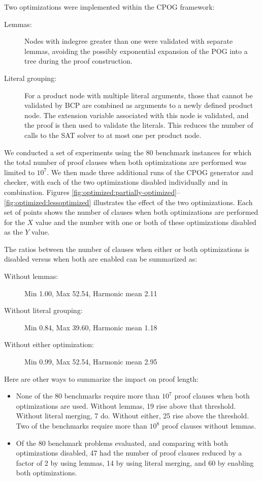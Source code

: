 \documentclass[letterpaper,USenglish,cleveref, autoref, thm-restate]{lipics-v2021}
\begin{document}
Two optimizations were implemented within the CPOG framework:
\begin{description}
\item[Lemmas:] Nodes with indegree greater than one were validated with separate lemmas, avoiding the possibly exponential expansion of the POG into a tree during the proof construction.

\item[Literal grouping:] For a product node with multiple literal
  arguments, those that cannot be validated by BCP are combined as
  arguments to a newly defined product node.  The extension variable
  associated with this node is validated, and the proof is then used
  to validate the literals.  This reduces the number of
  calls to the SAT solver to at most one per product node.
\end{description}





We conducted a set of experiments using the 80 benchmark instances for
which the total number of proof clauses when both optimizations are
performed was limited to $10^7$.  We then made three additional runs
of the CPOG generator and checker, with each of the two optimizations
disabled individually and in combination.  Figures
\ref{fig:optimized:partially-optimized}--\ref{fig:optimized:lessoptimized} illustrates the effect of the two
optimizations.  Each set of points shows the number of clauses when
both optimizations are performed for the $X$ value and the number with
one or both of these optimizations disabled as the $Y$ value.

The ratios between the number of clauses when either or both optimizations is disabled versus when both are enabled can be summarized as:
\begin{description}
\item[Without lemmas:] Min 1.00, Max 52.54, Harmonic mean 2.11
\item[Without literal grouping:] Min 0.84, Max 39.60, Harmonic mean 1.18
\item[Without either optimization:] Min 0.99, Max 52.54, Harmonic mean 2.95
\end{description}

Here are other ways to summarize the impact on proof length:
\begin{itemize}
\item None of the 80 benchmarks require more than $10^7$
proof clauses when both optimizations are used.  Without lemmas, 19
rise above that threshold.  Without literal merging, 7 do.  Without
either, 25 rise above the threshold.  Two of the benchmarks require
more than $10^8$ proof clauses without lemmas.
\item
  Of the 80 benchmark problems evaluated, and comparing with both
  optimizations disabled, 47 had the number of proof clauses reduced
  by a factor of 2 by using lemmas, 14 by using literal merging, and
  60 by enabling both optimizations.
\end{itemize}
\end{document}
